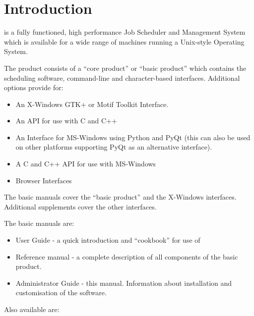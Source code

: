 \chapter{Introduction}
\label{chp:introduction}
\ProductName{} is a fully functioned, high performance Job Scheduler and
Management System which is available for a wide range of machines
running a Unix-style Operating System.


The product consists of a ``core product'' or ``basic product'' which contains the
scheduling software, command-line and character-based interfaces.
Additional options provide for:

\begin{itemize}
\item An X-Windows GTK+ or Motif Toolkit Interface. 
\item An API for use with C and C++ 
\item An Interface for MS-Windows using Python and PyQt (this can also be used on other platforms supporting PyQt as an alternative interface).
\item A C and C++ API for use with MS-Windows
\item Browser Interfaces
\end{itemize}
The basic manuals cover the ``basic product'' and the X-Windows interfaces. Additional supplements cover the other
interfaces.

The basic manuals are:

\begin{itemize}
\item User Guide - a quick introduction and ``cookbook'' for use of \ProductName{}
\item Reference manual - a complete description of all components of the basic product.
\item Administrator Guide - this manual. Information about installation and customisation of the software.
\end{itemize}
Also available are:

